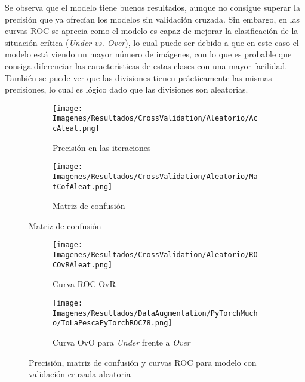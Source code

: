 \documentclass{report}
\begin{document}
Se observa que el modelo tiene buenos resultados, aunque no consigue superar la precisión que ya ofrecían los modelos sin validación cruzada. Sin embargo, en las curvas ROC se aprecia como el modelo es capaz de mejorar la clasificación de la situación crítica (\textit{Under vs. Over}), lo cual puede ser debido a que en este caso el modelo está viendo un mayor número de imágenes, con lo que es probable que consiga diferenciar las características de estas clases con una mayor facilidad. También se puede ver que las divisiones tienen prácticamente las mismas precisiones, lo cual es lógico dado que las divisiones son aleatorias.

\vspace{0.5cm}
\vspace{0.4cm}
\begin{figure}[H]
	 	\centering
            \begin{subfigure}[b]{0.45\linewidth}
	 	\centering
	 		\texttt{[image: Imagenes/Resultados/CrossValidation/Aleatorio/AccAleat.png]}
	 		\caption{ Precisión en las iteraciones }
                    \label{fig:CVAleaAcc}
	 	\end{subfigure}
	 	\begin{subfigure}[b]{0.45\linewidth}
	 	\centering
	 		\texttt{[image: Imagenes/Resultados/CrossValidation/Aleatorio/MatCofAleat.png]}
	 		\caption{ Matriz de confusión }
                    \label{fig:CVAleaMatConf}
	 	\end{subfigure}
\end{figure}
\vspace{0.5cm}
\begin{figure}[H]\ContinuedFloat
	 	\begin{subfigure}[b]{0.45\linewidth}
	 	\centering
	 		\texttt{[image: Imagenes/Resultados/CrossValidation/Aleatorio/ROCOvRAleat.png]}
                    \caption{ Curva ROC OvR}
                    \label{fig:CVAleaROCOvR}
	 	\end{subfigure}
            \begin{subfigure}[b]{0.45\linewidth}
	 	\centering
	 		\texttt{[image: Imagenes/Resultados/DataAugmentation/PyTorchMucho/ToLaPescaPyTorchROC78.png]}
                    \caption{ Curva OvO para \textit{Under} frente a \textit{Over} }
                    \label{fig:CVAleaROCOvO}
	 	\end{subfigure}
	 	\caption{ Precisión, matriz de confusión y curvas ROC para modelo con validación cruzada aleatoria }
	 	\label{fig:CVAlea}
\end{figure}
\end{document}
